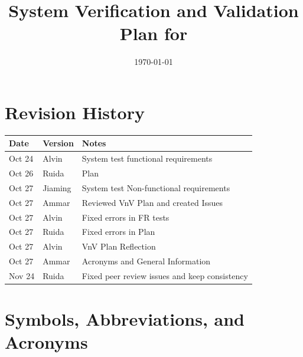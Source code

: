 \documentclass[12pt, titlepage]{article}
\begin{document}
\title{System Verification and Validation Plan for \\\progname{}} 
\author{
\authname
}
\date{\today}
	
\maketitle


\section*{Revision History}

\begin{tabularx}{\textwidth}{p{3cm}p{2cm}X}
\toprule {\bf Date} & {\bf Version} & {\bf Notes}\\
\midrule
Oct 24 & Alvin & System test functional requirements\\
Oct 26 & Ruida & Plan\\
Oct 27 & Jiaming & System test Non-functional requirements\\
Oct 27 & Ammar & Reviewed VnV Plan and created Issues \\
Oct 27 & Alvin & Fixed errors in FR tests\\
Oct 27 & Ruida & Fixed errors in Plan \\
Oct 27 & Alvin & VnV Plan Reflection \\
Oct 27 & Ammar & Acronyms and General Information \\
Nov 24 & Ruida & Fixed peer review issues and keep consistency\\
\bottomrule
\end{tabularx}


\newpage

\tableofcontents
\newpage
{}

\section{Symbols, Abbreviations, and Acronyms}
\end{document}
